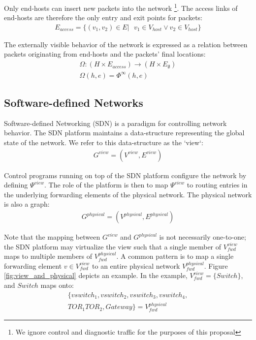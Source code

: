 \documentclass{sig-alternate-10pt}
\begin{document}
Only end-hosts can insert new packets into the network \footnote{We ignore
control and diagnostic traffic for the purposes of this proposal}. The access links
of end-hosts are therefore the only entry and exit points for packets:
\begin{align*}
E_{access} = \{ (v_1,v_2) \in E |\text{ } v_1 \in V_{host} \vee v_2 \in V_{host} \}
\end{align*}

The externally visible behavior of the network is expressed as a relation between
packets originating from end-hosts and the packets' final locations:
\begin{align*}
\Omega: (H \times E_{access}) \rightarrow (H \times E_{\emptyset}) \\
\Omega(h,e) = \Phi^{\infty}(h,e)
\end{align*}

\subsection{Software-defined Networks}

Software-defined Networking (SDN) is a paradigm for controlling network behavior.
The SDN platform maintains a data-structure representing the global state of the
network. We refer to this data-structure as the `view`:
\begin{align*}
G^{view} = (V^{view},E^{view})
\end{align*}

Control programs running on top of the SDN platform configure the network by
defining $\Psi^{view}$. The role of the platform is then to map $\Psi^{view}$ to
routing entries in the underlying forwarding elements of the
physical network. The physical network is also a graph:
\begin{align*}
G^{physical} = (V^{physical}, E^{physical}) 
\end{align*}

Note that the mapping between $G^{view}$ and $G^{physical}$ is not
necessarily one-to-one; the SDN platform may virtualize the view
such that a single member of $V_{fwd}^{view}$ maps to multiple members of
$V_{fwd}^{physical}$. A common pattern is to map a single forwarding element $v \in V_{fwd}^{view}$ to
an entire physical network $V_{fwd}^{physical}$. Figure \ref{fig:view_and_physical}
depicts an example. In the example, $V_{fwd}^{view} = \{ Switch \}$, and
$Switch$ maps onto:
\begin{align*}
\{ vswitch_1, vswitch_2, vswitch_3,  vswitch_4, \\
TOR_1 TOR_2, Gateway \} = V_{fwd}^{physical} 
\end{align*}
\end{document}
